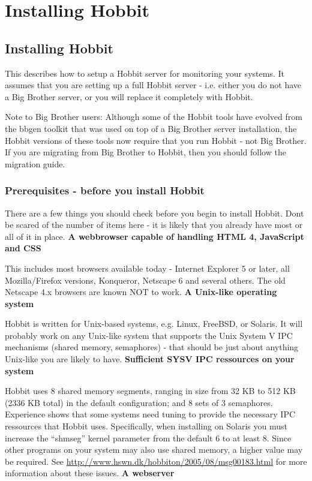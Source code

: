 \chapter{Installing Hobbit}
\section{Installing Hobbit}


 This describes how to setup a Hobbit server for monitoring your
 systems. It assumes that you are setting up a full Hobbit server -
 i.e. either you do not have a Big Brother server, or you will replace
 it completely with Hobbit.



 Note to Big Brother users: Although some of the Hobbit tools have evolved from the bbgen toolkit that was used on top of a Big Brother server installation, the Hobbit versions of these tools now require that you run Hobbit - not Big Brother. If you are migrating from Big Brother to Hobbit, then you should follow the migration guide.
\subsection{Prerequisites - before you install Hobbit}


 There are a few things you should check before you begin to install Hobbit. Dont be scared of the number of items here - it is likely that you already have most or all of it in place.
\textbf{A webbrowser capable of handling HTML 4, JavaScript and CSS}


 This includes most browsers available today - Internet Explorer 5 or later, all Mozilla/Firefox versions, Konqueror, Netscape 6 and several others. The old Netscape 4.x browsers are known NOT to work.
\textbf{A Unix-like operating system}


 Hobbit is written for Unix-based systems, e.g. Linux, FreeBSD, or Solaris. It will probably work on any Unix-like system that supports the Unix System V IPC mechanisms (shared memory, semaphores) - that should be just about anything Unix-like you are likely to have.
\textbf{Sufficient SYSV IPC ressources on your system}


 Hobbit uses 8 shared memory segments, ranging in size from 32 KB to 512 KB (2336 KB total) in the default configuration; and 8 sets of 3 semaphores. Experience shows that some systems need tuning to provide the necessary IPC ressources that Hobbit uses. Specifically, when installing on Solaris you must increase the ``shmseg'' kernel parameter from the default 6 to at least 8. Since other programs on your system may also use shared memory, a higher value may be required. See \url{http://www.hswn.dk/hobbiton/2005/08/msg00183.html} for more information about these issues.
\textbf{A webserver}


